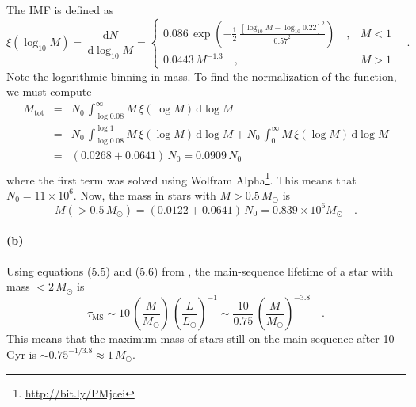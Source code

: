 \documentclass[11pt]{article}
\newcommand{\sun}{\odot}
\newcommand{\dd}{\ensuremath{\,\mathrm{d}}}
\begin{document}
The \citet{chabrier} IMF is defined as
\begin{equation}
    \xi (\log_{10} M) = \frac{\dd N}{\dd \log_{10} M} = \left \{
    \begin{array}{ll}
        {\displaystyle
            0.086 \, \exp \left ( -\frac{1}{2} \,
            \frac{\left [ \log_{10} M - \log_{10} 0.22 \right ]^2}{0.57^2}
            \right ) \quad,} & M < 1 \\
        {\displaystyle 0.0443 \, M^{-1.3}} \quad, & M > 1
    \end{array} \right . \quad.
\end{equation}
Note the logarithmic binning in mass. To find the normalization of the
function, we must compute
\begin{eqnarray}
    M_\mathrm{tot} & = & N_0 \, \int_{\log 0.08} ^{\infty}
                         M \, \xi (\log M) \dd \log M \\
                   & = & N_0 \, \int_{\log 0.08} ^{\log 1}
                         M \, \xi (\log M) \dd \log M +
                         N_0 \, \int_0 ^\infty M \, \xi(\log M) \dd \log M \\
                   & = & (0.0268 + 0.0641) \, N_0 = 0.0909 \, N_0 \\
\end{eqnarray}
where the first term was solved using Wolfram
Alpha\footnote{\url{http://bit.ly/PMjcei}}. This means that $N_0 =
11 \times 10^6$. Now, the mass in stars with $M > 0.5 \, M_\sun$ is
\begin{equation}
    M (>0.5 \, M_\sun) = (0.0122 + 0.0641) \, N_0 = 0.839 \times 10^6 M_\sun
    \quad.
\end{equation}


\paragraph{(b)} Using equations (5.5) and (5.6) from \citet{BM}, the
main-sequence lifetime of a star with mass $< 2 \, M_\sun$ is
\begin{equation}
    \tau_\mathrm{MS} \sim 10 \, \left (\frac{M}{M_\sun} \right ) \,
        \left ( \frac{L}{L_\sun} \right ) ^{-1}
        \sim \frac{10}{0.75} \, \left ( \frac{M}{M_\sun} \right )^{-3.8}
        \quad.
\end{equation}
This means that the maximum mass of stars still on the main sequence after
10 Gyr is $\sim 0.75^{-1/3.8} \approx 1 \, M_\sun$.
\end{document}
